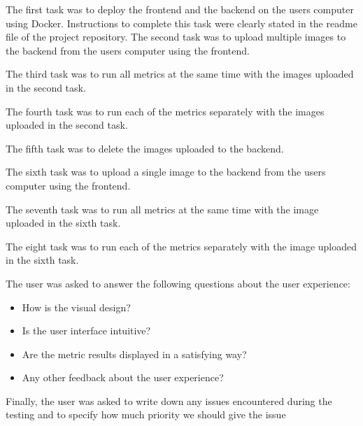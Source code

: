 The first task was to deploy the frontend and the backend on the users computer using Docker. Instructions to complete this task were clearly stated in the readme file of the project repository. 
The second task was to upload multiple images to the backend from the users computer using the frontend.

The third task was to run all metrics at the same time with the images uploaded in the second task. 

The fourth task was to run each of the metrics separately with the images uploaded in the second task. 

The fifth task was to delete the images uploaded to the backend.

The sixth task was to upload a single image to the backend from the users computer using the frontend.

The seventh task was to run all metrics at the same time with the image uploaded in the sixth task.

The eight task was to run each of the metrics separately with the image uploaded in the sixth task. 

The user was asked to answer the following questions about the user experience:
\begin{itemize}
    \item How is the visual design?
    \item Is the user interface intuitive?
    \item Are the metric results displayed in a satisfying way?
    \item Any other feedback about the user experience?
\end{itemize}

Finally, the user was asked to write down any issues encountered during the testing and to specify how much priority we should give the issue



